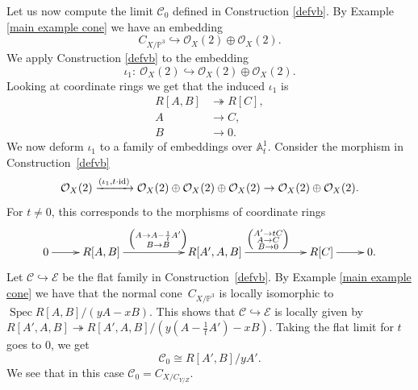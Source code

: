 \documentclass[pdftex]{sigma}
\numberwithin{equation}{section}
\newcommand{\OO}{\mathcal{O}}
\newcommand{\PP}{\mathbb P}
\theoremstyle{plain}
\theoremstyle{definition}
\theoremstyle{remark}
\begin{document}
\begin{Example}\label{limit main example}Let us now compute the limit $\mathcal{C}_0$ defined in Construction \ref{defvb}. By Example \ref{main example cone} we have an embedding
\[
C_{X/\PP^3}\hookrightarrow\OO_X(2)\oplus\OO_X(2).
\]
We apply Construction \ref{defvb} to the embedding
\[\iota_1\colon \ \OO_X(2)\hookrightarrow \OO_X(2)\oplus\OO_X(2).\]
Looking at coordinate rings we get that the induced $\iota_1$ is
\begin{align*}
R[A,B]&\twoheadrightarrow R[C],\\
A&\rightarrow C,\\
B&\rightarrow 0.
\end{align*}
We now deform $\iota_1$ to a family of embeddings over $\mathbb A^1_t$. Consider the morphism in Construction~\ref{defvb}
\[\OO_X(2)\xrightarrow{(\iota_1,t\cdot {\rm id})} \OO_X(2)\oplus\OO_X(2)\oplus\OO_X(2)\rightarrow\OO_X(2)\oplus\OO_X(2).\]
For $t\neq 0$, this corresponds to the morphisms of coordinate rings
\begin{align*}
\xymatrix{0\ar[r] & R[A,B]\ar[rr]^{\left(\substack{A\to A-\frac{1}{t}A'\\ B\to B}\right)} & & R[A',A,B]\ar[rr]^{\left(\substack{A'\to tC\\ A\to C\\ B\to 0}\right)} & & R[C]\ar[r] & 0.}
\end{align*}
Let $\mathcal C\hookrightarrow \mathcal{E}$ be the flat family in Construction~\ref{defvb}. By Example \ref{main example cone} we have that the normal cone~$C_{X/\PP^3}$ is locally isomorphic to $\operatorname{Spec}R[A,B]/(yA-xB)$.
This shows that $\mathcal C\hookrightarrow \mathcal{E}$ is locally given by $R[A',A,B]\twoheadrightarrow R[A',A,B]/(y(A-\frac{1}{t}A')-xB)$.
Taking the flat limit for $t$ goes to $0$, we get
\[\mathcal C_0\cong R[A',B]/yA'.\]
We see that in this case $\mathcal C_0= C_{X/C_{Y/Z}}$.
\end{Example}
\end{document}
